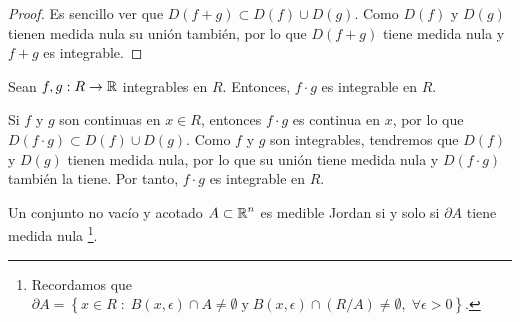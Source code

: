 \begin{proof}
Es sencillo ver que $\displaystyle D\left(f + g\right)\subset D\left(f\right) \cup D\left(g\right) $. Como $\displaystyle D\left(f\right) $ y $\displaystyle D\left(g\right) $ tienen medida nula su unión también, por lo que $\displaystyle D\left(f + g\right) $ tiene medida nula y $\displaystyle f + g $ es integrable.
\end{proof}
\begin{colorary}
Sean $\displaystyle f, g : R \to \mathbb{R} $ integrables en $\displaystyle R $. Entonces, $\displaystyle f \cdot g $ es integrable en $\displaystyle R $.
\end{colorary}
Si $\displaystyle f $ y $\displaystyle g $ son continuas en $\displaystyle x \in R $, entonces $\displaystyle f \cdot g $ es continua en $\displaystyle x $, por lo que $\displaystyle D\left(f \cdot g\right)\subset D\left(f\right) \cup D\left(g\right) $. Como $\displaystyle f $ y $\displaystyle g $ son integrables, tendremos que $\displaystyle D\left(f\right) $ y $\displaystyle D\left(g\right) $ tienen medida nula, por lo que su unión tiene medida nula y $\displaystyle D\left(f \cdot g\right) $ también la tiene. Por tanto, $\displaystyle f \cdot g $ es integrable en $\displaystyle R $. 
\begin{prop}
Un conjunto no vacío y acotado $\displaystyle A \subset \mathbb{R}^{n} $ es medible Jordan si y solo si $\displaystyle \partial A $ tiene medida nula \footnote{Recordamos que $\displaystyle \partial A = \left\{ x \in R \; : \; B\left(x,\epsilon \right)\cap A \neq \emptyset \; \text{y} \; B\left(x,\epsilon \right) \cap \left(R/A\right) \neq \emptyset, \; \forall \epsilon > 0\right\}  $. }.
\end{prop}

